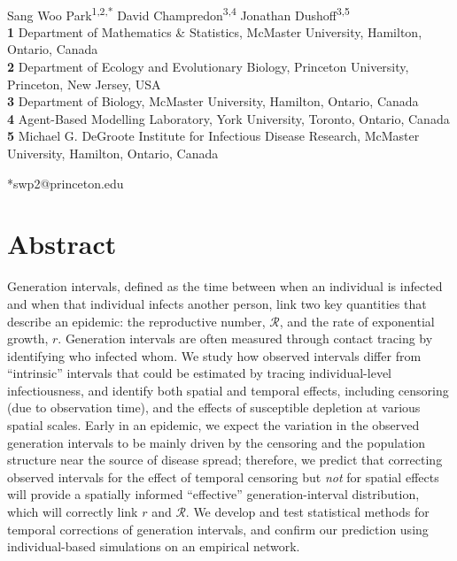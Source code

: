 \documentclass[12pt]{article}
\date{\today}
\newcommand{\RR}{\ensuremath{{\mathcal R}}}
\begin{document}
\begin{flushleft}{
	\Large
	\textbf{}
}
\newline
\\
Sang Woo Park\textsuperscript{1,2,*}
David Champredon\textsuperscript{3,4}
Jonathan Dushoff\textsuperscript{3,5}
\\

\bigskip
\textbf{1} Department of Mathematics \& Statistics, McMaster University, Hamilton, Ontario, Canada
\\
\textbf{2} Department of Ecology and Evolutionary Biology, Princeton University, Princeton, New Jersey, USA
\\
\textbf{3} Department of Biology, McMaster University, Hamilton, Ontario, Canada
\\
\textbf{4} Agent-Based Modelling Laboratory, York University, Toronto, Ontario, Canada
\\
\textbf{5} Michael G. DeGroote Institute for Infectious Disease Research, McMaster University, Hamilton, Ontario, Canada
\\
\bigskip

*swp2@princeton.edu
\end{flushleft} 

\section*{Abstract}

Generation intervals, defined as the time between when an individual is infected and when that individual infects another person, link two key quantities that describe an epidemic: the reproductive number, $\RR$, and the rate of exponential growth, $r$.
Generation intervals are often measured through contact tracing by identifying who infected whom.
We study how observed intervals differ from ``intrinsic'' intervals that could be estimated by tracing individual-level infectiousness, and identify both spatial and temporal effects, including censoring (due to observation time), and the effects of susceptible depletion at various spatial scales. 
Early in an epidemic, we expect the variation in the observed generation intervals to be mainly driven by the censoring and the population structure near the source of disease spread; 
therefore, we predict that correcting observed intervals for the effect of temporal censoring but \emph{not} for spatial effects will provide a spatially informed ``effective'' generation-interval distribution, which will correctly link $r$ and $\RR$.
We develop and test statistical methods for temporal corrections of generation intervals,
and confirm our prediction using individual-based simulations on an empirical network.
\end{document}
